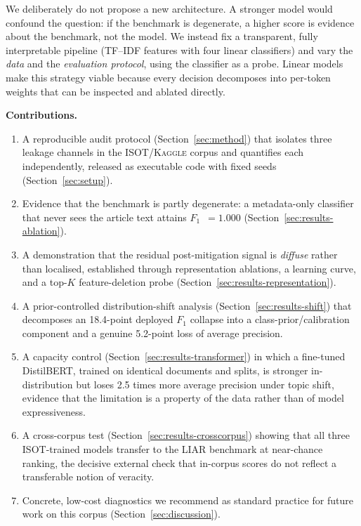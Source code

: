 \documentclass[conference]{IEEEtran}
\newcommand{\dataset}{\textsc{ISOT/Kaggle}}
\newcommand{\Fone}{$F_1$}
\begin{document}
We deliberately do not propose a new architecture. A stronger model would
confound the question: if the benchmark is degenerate, a higher score is
evidence about the benchmark, not the model. We instead fix a transparent,
fully interpretable pipeline (TF--IDF features with four linear classifiers)
and vary the \emph{data} and the \emph{evaluation protocol},
using the classifier as a probe. Linear models make this strategy viable
because every decision decomposes into per-token weights that can be inspected
and ablated directly.

\noindent\textbf{Contributions.}
\begin{enumerate}
  \item A reproducible audit protocol (Section~\ref{sec:method}) that isolates
    three leakage channels in the \dataset{} corpus and quantifies each
    independently, released as executable code with fixed seeds
    (Section~\ref{sec:setup}).
  \item Evidence that the benchmark is partly degenerate: a metadata-only
    classifier that never sees the article text attains \Fone{}~$=1.000$
    (Section~\ref{sec:results-ablation}).
  \item A demonstration that the residual post-mitigation signal is
    \emph{diffuse} rather than localised, established through representation
    ablations, a learning curve, and a top-$K$ feature-deletion probe
    (Section~\ref{sec:results-representation}).
  \item A prior-controlled distribution-shift analysis
    (Section~\ref{sec:results-shift}) that decomposes an 18.4-point deployed
    \Fone{} collapse into a class-prior/calibration component and a genuine
    5.2-point loss of average precision.
  \item A capacity control (Section~\ref{sec:results-transformer}) in which a
    fine-tuned DistilBERT, trained on identical documents and splits, is
    stronger in-distribution but loses 2.5 times more average precision under
    topic shift, evidence that the limitation is a property of the data rather
    than of model expressiveness.
  \item A cross-corpus test (Section~\ref{sec:results-crosscorpus}) showing that
    all three ISOT-trained models transfer to the LIAR benchmark at near-chance
    ranking, the decisive external check that in-corpus scores do not reflect a
    transferable notion of veracity.
  \item Concrete, low-cost diagnostics we recommend as standard practice for
    future work on this corpus (Section~\ref{sec:discussion}).
\end{enumerate}
\end{document}
